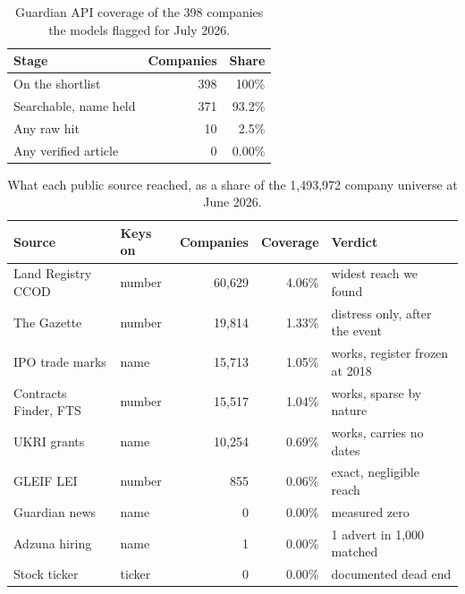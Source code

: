 \documentclass[    author={Samuel Menon Demelo; Sneha Saphala Ram Prasad; 
Viktor Ander Lindholm; Vishal Khatri},
               supervisor={Prof. Fernando Moreno-Pino},
                   degree={MSc},
                    title={Lloyds Commercial Banking Intelligence},
                 subtitle={Ranking SME Lending, Risk and Growth Prospects for Lloyds Banking Group},
                     type={},
                     year={2026}]{dissertation}
\begin{document}
\begin{collapsable}
\begin{table}[htbp]
\centering
\caption[Guardian API coverage]{Guardian API coverage of the 398 companies the models flagged for July 2026.}
\label{tab:news-funnel}
\begin{tabular}{lrr}
\toprule
Stage & Companies & Share \\
\midrule
On the shortlist      & 398 & 100\% \\
Searchable, name held & 371 & 93.2\% \\
Any raw hit           &  10 & 2.5\% \\
Any verified article  &   0 & 0.00\% \\
\bottomrule
\end{tabular}
\end{table}
\end{collapsable}


\begin{collapsable}
\begin{table}[htbp]
\centering
\caption[Public sources reach-rate]{What each public source reached, as a share of the 1,493,972 company
universe at June 2026.}
\label{tab:source-coverage}
\begin{tabular}{llrrl}
\toprule
Source & Keys on & Companies & Coverage & Verdict \\
\midrule
Land Registry CCOD    & number & 60{,}629 & 4.06\% & widest reach we found \\
The Gazette           & number & 19{,}814 & 1.33\% & distress only, after the event \\
IPO trade marks       & name   & 15{,}713 & 1.05\% & works, register frozen at 2018 \\
Contracts Finder, FTS & number & 15{,}517 & 1.04\% & works, sparse by nature \\
UKRI grants           & name   & 10{,}254 & 0.69\% & works, carries no dates \\
GLEIF LEI             & number &      855 & 0.06\% & exact, negligible reach \\
Guardian news         & name   &        0 & 0.00\% & measured zero \\
Adzuna hiring         & name   &        1 & 0.00\% & 1 advert in 1{,}000 matched \\
Stock ticker          & ticker &        0 & 0.00\% & documented dead end \\
\bottomrule
\end{tabular}
\end{table}
\end{collapsable}
\end{document}
